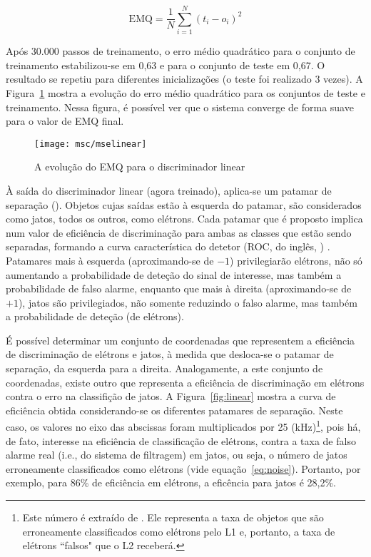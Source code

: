 \begin{equation}
\text{EMQ} = \frac{1}{N} \sum^N_{i=1}(t_i-o_i)^2
\label{eq:emq}
\end{equation}

Após 30.000 passos de treinamento, o erro médio quadrático para o conjunto de
treinamento estabilizou-se em 0,63 e para o conjunto de teste em 0,67. O
resultado se repetiu para diferentes inicializações (o teste foi realizado 3
vezes). A Figura~\ref{fig:mse-linear} mostra a evolução do erro médio
quadrático para os conjuntos de teste e treinamento. Nessa figura, é possível ver
que o sistema converge de forma suave para o valor de EMQ final.

\begin{figure}
\begin{center}
\texttt{[image: msc/mselinear]}
\end{center}
\caption{A evolução do EMQ para o discriminador linear}
\label{fig:mse-linear}
\end{figure}

À saída do discriminador linear (agora treinado), aplica-se um patamar de
separação (). Objetos cujas saídas estão à esquerda do patamar,
são considerados como jatos, todos os outros, como elétrons. Cada patamar que
é proposto implica num valor de eficiência de discriminação para ambas as
classes que estão sendo separadas, formando a curva característica do detetor
(ROC, do inglês, )
\cite{vantrees}. Patamares mais à esquerda (aproximando-se de $-1$)
privilegiarão elétrons, não só aumentando a probabilidade de deteção do sinal
de interesse, mas também a probabilidade de falso alarme, enquanto que mais à
direita (aproximando-se de $+1$), jatos são privilegiados, não somente
reduzindo o falso alarme, mas também a probabilidade de deteção (de elétrons).

É possível determinar um conjunto de coordenadas que representem a eficiência
de discriminação de elétrons e jatos, à medida que desloca-se o patamar de
separação, da esquerda para a direita. Analogamente, a este conjunto de
coordenadas, existe outro que representa a eficiência de discriminação em
elétrons contra o erro na classifição de jatos. A Figura~\ref{fig:linear}
mostra a curva de eficiência obtida considerando-se os diferentes patamares de
separação. Neste caso, os valores no eixo das abscissas foram multiplicados
por 25 (kHz)\footnote{Este número é extraído de \cite{daqnote00-02}. Ele
representa a taxa de objetos que são erroneamente classificados como elétrons
pelo L1 e, portanto, a taxa de elétrons ``falsos" que o L2 receberá.}, pois
há, de fato, interesse na eficiência de classificação de elétrons, contra a
taxa de falso alarme real (i.e., do sistema de filtragem) em jatos, ou seja, o
número de jatos erroneamente classificados como elétrons (vide
equação~\ref{eq:noise}). Portanto, por exemplo, para 86\% de eficiência em
elétrons, a eficência para jatos é 28,2\%.

